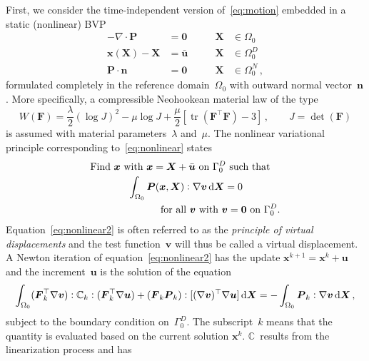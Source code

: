 \documentclass[a4paper,DIV=12,10pt]{scrartcl}
\newcommand{\vek}[1]{\boldsymbol{#1}}  %
\newcommand{\col}[0]{\vcentcolon}
\DeclareMathOperator{\tr}{tr}
\newcommand{\x}[0]{\vek{x}}
\newcommand{\X}[0]{\vek{X}}
\newcommand{\U}[0]{\vek{u}}
\newcommand{\V}[0]{\vek{v}}
\newcommand{\N}[0]{\vek{n}}
\begin{document}
First, we consider the time-independent version of~\eqref{eq:motion}
embedded in a static (nonlinear) BVP
\begin{equation}
  \label{eq:nonlinear}
  \begin{aligned}
    -\nabla \cdot \vek{P} &= \vek{0} \qquad &\X &\in \Omega_0 \\
    \x(\X) - \X&= \bar{\vek{u}}  &\X &\in \Omega_0^D \\
    \vek{P} \cdot \N &= \vek{0}  &\X &\in \Omega_0^N\,,
  \end{aligned}
\end{equation}
formulated completely in the reference domain~$\Omega_0$ with outward
normal vector~$\N$. More specifically, a compressible Neohookean
material law of the type
\begin{equation}
  \label{eq:neohooke}
  W(\vek{F}) = \frac{\lambda}{2} (\log J)^2 - \mu \log J
  + \frac{\mu}{2}[ \tr (\vek{F}^\top \vek{F}) - 3 ]\,,\qquad 
  J  = \det(\vek{F})
\end{equation}
is assumed with material parameters~$\lambda$ and~$\mu$. The nonlinear
variational principle corresponding to~\eqref{eq:nonlinear} states
\begin{equation}  \label{eq:nonlinear2}
  \begin{multlined}[c][.8\displaywidth]
    \text{Find $\x$ with $\x = \X + \bar{\vek{u}}$ on $\Gamma_0^D$ such
      that}\\
    \int_{\Omega_0} \vek{P}(\x,\X) \col \nabla \V \dif \X = 0\\
    \text{for all $\V$ with $\V = \vek{0}$ on $\Gamma_0^D$.}
  \end{multlined}
\end{equation}
Equation~\eqref{eq:nonlinear2} is often referred to as the
\emph{principle of virtual displacements} and the test function~$\V$
will thus be called a virtual displacement. 
A Newton iteration of equation~\eqref{eq:nonlinear2} 
has the update $\x^{k+1} = \x^k + \U$ and the increment~$\U$ is the
solution of the equation
\begin{equation}
  \label{eq:newton}
  \int_{\Omega_0} (\vek{F}^\top_k \nabla \V) \col \mathbb{C}_k \col
  (\vek{F}^\top_k \nabla \U) + 
  (\vek{F}_k \vek{P}_k) \col [(\nabla \V)^\top \nabla \U] \dif \X
  = - \int_{\Omega_0} \vek{P}_k \col \nabla \V \dif \X\,,
\end{equation}
subject to the boundary condition on~$\Gamma_0^D$.  The subscript~$k$
means that the quantity is evaluated based on the current solution
$\x^k$. $\mathbb{C}$~results from the linearization process and has
\end{document}

